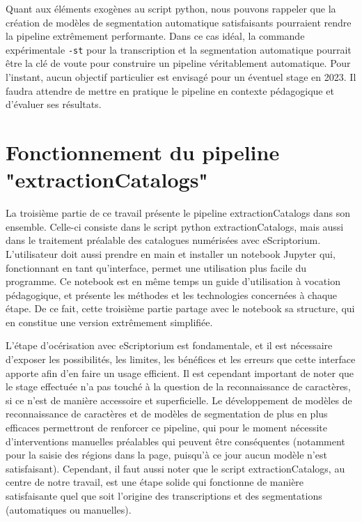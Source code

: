 \documentclass[a4paper,12pt,twoside]{book}
\begin{document}
Quant aux éléments exogènes au script python, nous pouvons rappeler que la création de modèles de segmentation automatique satisfaisants pourraient rendre la pipeline extrêmement performante. Dans ce cas idéal, la commande expérimentale \texttt{-st} pour la transcription et la segmentation automatique pourrait être la clé de voute pour construire un pipeline véritablement automatique. Pour l'instant, aucun objectif particulier est envisagé pour un éventuel stage en 2023. Il faudra attendre de mettre en pratique le pipeline en contexte pédagogique et d'évaluer ses résultats. 









\part{Fonctionnement du pipeline "extractionCatalogs"}


La troisième partie de ce travail présente le pipeline extractionCatalogs dans son ensemble. Celle-ci consiste dans le script python extractionCatalogs, mais aussi dans le traitement préalable des catalogues numérisées avec eScriptorium. L'utilisateur doit aussi prendre en main et installer un notebook Jupyter qui, fonctionnant en tant qu'interface, permet une utilisation plus facile du programme. Ce notebook est en même temps un guide d'utilisation à vocation pédagogique, et présente les méthodes et les technologies concernées à chaque étape. De ce fait, cette troisième partie partage avec le notebook sa structure, qui en constitue une version extrêmement simplifiée.

L'étape d'océrisation avec eScriptorium est fondamentale, et il est nécessaire d'exposer les possibilités, les limites, les bénéfices et les erreurs que cette interface apporte afin d'en faire un usage efficient. Il est cependant important de noter que le stage effectuée n'a pas touché à la question de la reconnaissance de caractères, si ce n'est de manière accessoire et superficielle. Le développement de modèles de reconnaissance de caractères et de modèles de segmentation de plus en plus efficaces permettront de renforcer ce pipeline, qui pour le moment nécessite d'interventions manuelles préalables qui peuvent être conséquentes (notamment pour la saisie des régions dans la page, puisqu'à ce jour aucun modèle n'est satisfaisant). Cependant, il faut aussi noter que le script extractionCatalogs, au centre de notre travail, est une étape solide qui fonctionne de manière satisfaisante quel que soit l'origine des transcriptions et des segmentations (automatiques ou manuelles).
\end{document}
